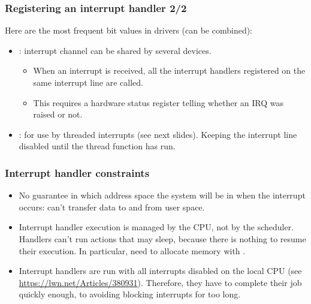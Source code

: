 \begin{frame}
  \frametitle{Registering an interrupt handler 2/2}
  Here are the most frequent  bit values
  in drivers (can be combined):
  \begin{itemize}
     \item {}: interrupt channel can be shared by several devices.
     \begin{itemize}
        \item When an interrupt is received, all the interrupt
        handlers registered on the same interrupt line are called.
        \item This requires a hardware status register telling whether
        an IRQ was raised or not.
     \end{itemize}
     \item {}: for use by threaded interrupts (see
     next slides). Keeping the interrupt line disabled until the thread
     function has run.
  \end{itemize}
\end{frame}

\begin{frame}
  \frametitle{Interrupt handler constraints}
  \begin{itemize}
  \item No guarantee in which address space the system will be in when
    the interrupt occurs: can't transfer data to and from user space.
  \item Interrupt handler execution is managed by the CPU, not by the
    scheduler.  Handlers can't run actions that may sleep, because
    there is nothing to resume their execution. In particular, need to
    allocate memory with .
  \item Interrupt handlers are run with all interrupts disabled on
    the local CPU (see \url{https://lwn.net/Articles/380931}).
    Therefore, they have to complete their job quickly
    enough, to avoiding blocking interrupts for too long.
  \end{itemize}
\end{frame}

